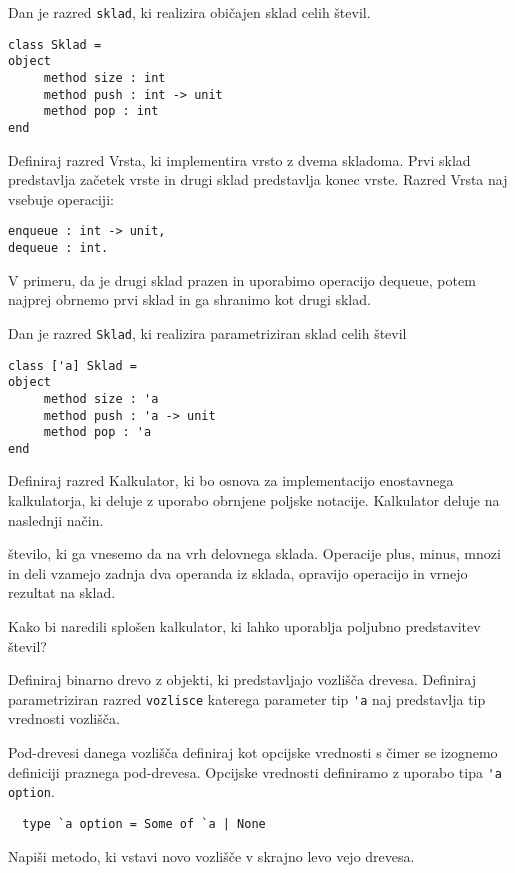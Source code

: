 \begin{ex}
Dan je razred \lstinline{sklad}, ki realizira obi\v cajen sklad celih \v stevil.
\begin{lstlisting}
class Sklad =
object 
     method size : int
     method push : int -> unit
     method pop : int
end
\end{lstlisting}

Definiraj razred Vrsta, ki implementira vrsto z dvema skladoma. Prvi sklad predstavlja za\v cetek vrste in drugi sklad predstavlja konec vrste. Razred Vrsta naj vsebuje operaciji: 
\begin{lstlisting}
enqueue : int -> unit, 
dequeue : int. 
\end{lstlisting}
V primeru, da je drugi sklad prazen in uporabimo operacijo dequeue, potem najprej obrnemo prvi sklad in ga shranimo kot drugi sklad.
\end{ex}



\begin{ex}
Dan je razred \texttt{Sklad}, ki realizira parametriziran sklad celih \v stevil
\begin{lstlisting}
class ['a] Sklad =
object 
     method size : 'a
     method push : 'a -> unit
     method pop : 'a
end
\end{lstlisting}
Definiraj razred Kalkulator, ki bo osnova za implementacijo enostavnega kalkulatorja, ki deluje z uporabo obrnjene poljske notacije. Kalkulator deluje na naslednji na\v cin.  

\v stevilo, ki ga vnesemo da na vrh delovnega sklada. Operacije plus, minus, mnozi in deli vzamejo zadnja dva operanda iz sklada, opravijo operacijo in vrnejo rezultat na sklad. 

Kako bi naredili splo\v sen kalkulator, ki lahko uporablja poljubno predstavitev \v stevil?


\end{ex} 



\begin{ex}
  Definiraj binarno drevo z objekti, ki predstavljajo vozli\v s\v
  ca drevesa. Definiraj parametriziran razred \lstinline{vozlisce}
  katerega parameter tip \lstinline{'a} naj predstavlja tip vrednosti
  vozli\v s\v ca.

  Pod-drevesi danega vozli\v s\v ca definiraj kot opcijske vrednosti s
  \v cimer se izognemo definiciji praznega pod-drevesa. Opcijske
  vrednosti definiramo z uporabo tipa \lstinline{'a option}.

  \begin{lstlisting}
  type `a option = Some of `a | None
  \end{lstlisting}

  Napi\v si metodo, ki vstavi novo vozli\v s\v ce v skrajno levo vejo
  drevesa.
\end{ex} 



